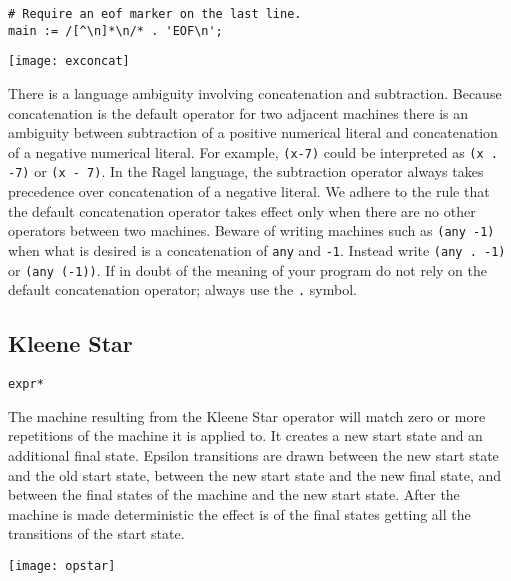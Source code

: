 \documentclass[letterpaper,11pt,oneside]{book}
\newcommand{\verbspace}{\vspace{10pt}}
\newcommand{\graphspace}{\vspace{10pt}}
\newenvironment{inline_code}{\def\baselinestretch{1}\vspace{12pt}\small}{}
\begin{document}
\begin{inline_code}
\begin{verbatim}
# Require an eof marker on the last line.
main := /[^\n]*\n/* . 'EOF\n';
\end{verbatim}
\end{inline_code}

\graphspace
\begin{center}
\texttt{[image: exconcat]}
\end{center}
\graphspace

 There is a language
ambiguity involving concatenation and subtraction. Because concatenation is the 
default operator for two
adjacent machines there is an ambiguity between subtraction of
a positive numerical literal and concatenation of a negative numerical literal.
For example, \verb|(x-7)| could be interpreted as \verb|(x . -7)| or 
\verb|(x - 7)|. In the Ragel language, the subtraction operator always takes precedence
over concatenation of a negative literal. We adhere to the rule that the default
concatenation operator takes effect only when there are no other operators between
two machines. Beware of writing machines such as \verb|(any -1)| when what is
desired is a concatenation of \verb|any| and \verb|-1|. Instead write 
\verb|(any . -1)| or \verb|(any (-1))|. If in doubt of the meaning of your program do not
rely on the default concatenation operator; always use the \verb|.| symbol.


\subsection{Kleene Star}

\verb|expr*|
\verbspace

The machine resulting from the Kleene Star operator will match zero or more
repetitions of the machine it is applied to.
It creates a new start state and an additional final
state.  Epsilon transitions are drawn between the new start state and the old start
state, between the new start state and the new final state, and
between the final states of the machine and the new start state.  After the
machine is made deterministic the effect is of the final states getting all the
transitions of the start state. 

\graphspace
\begin{center}
\texttt{[image: opstar]}
\end{center}
\graphspace
\end{document}
